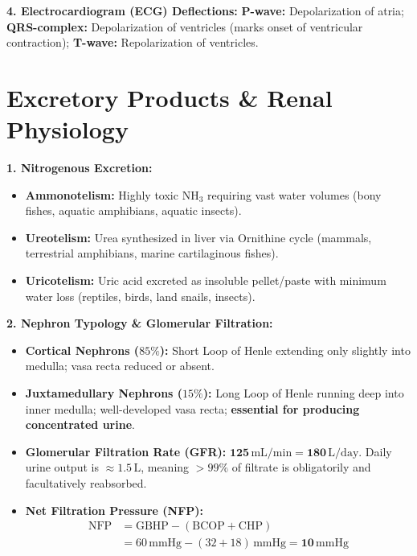 \documentclass[10pt,twoside,openright]{book}
\begin{document}
\begin{conceptbox}
\textbf{4. Electrocardiogram (ECG) Deflections:}
\textbf{P-wave:} Depolarization of atria; \textbf{QRS-complex:} Depolarization of ventricles (marks onset of ventricular contraction); \textbf{T-wave:} Repolarization of ventricles.
\end{conceptbox}

\section{Excretory Products \& Renal Physiology}

\begin{conceptbox}
\textbf{1. Nitrogenous Excretion:}
\begin{itemize}
  \item \textbf{Ammonotelism:} Highly toxic $\mathrm{NH}_3$ requiring vast water volumes (bony fishes, aquatic amphibians, aquatic insects).
  \item \textbf{Ureotelism:} Urea synthesized in liver via Ornithine cycle (mammals, terrestrial amphibians, marine cartilaginous fishes).
  \item \textbf{Uricotelism:} Uric acid excreted as insoluble pellet/paste with minimum water loss (reptiles, birds, land snails, insects).
\end{itemize}

\textbf{2. Nephron Typology \& Glomerular Filtration:}
\begin{itemize}
  \item \textbf{Cortical Nephrons ($85\%$):} Short Loop of Henle extending only slightly into medulla; vasa recta reduced or absent.
  \item \textbf{Juxtamedullary Nephrons ($15\%$):} Long Loop of Henle running deep into inner medulla; well-developed vasa recta; \textbf{essential for producing concentrated urine}.
  \item \textbf{Glomerular Filtration Rate (GFR):} $\mathbf{125\,\mathrm{mL/min} = 180\,\mathrm{L/day}}$. Daily urine output is $\approx 1.5\,\mathrm{L}$, meaning $>99\%$ of filtrate is obligatorily and facultatively reabsorbed.
  \item \textbf{Net Filtration Pressure (NFP):}
  \begin{align*}
    \mathrm{NFP} &= \mathrm{GBHP - (BCOP + CHP)} \\
                 &= 60\,\mathrm{mmHg} - (32 + 18)\,\mathrm{mmHg} = \mathbf{10\,\mathrm{mmHg}}
  \end{align*}
\end{itemize}


\end{conceptbox}
\end{document}
